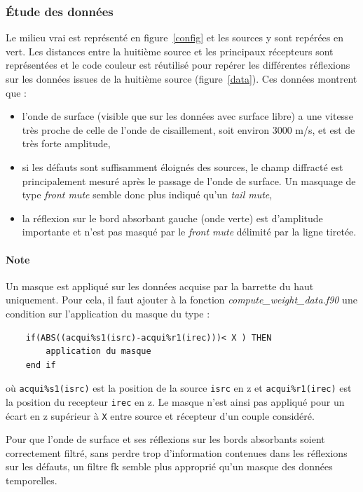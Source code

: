 \documentclass[a4paper,11pt]{report} %
\begin{document}
\subsubsection{Étude des données}
Le milieu vrai est représenté en figure~\ref{config} et les sources y sont repérées en vert. Les distances entre la huitième source et les principaux récepteurs sont représentées et le code couleur est réutilisé pour repérer les différentes réflexions sur les données issues de la huitième source (figure~\ref{data}). Ces données montrent que :
\begin{itemize}
	\item l'onde de surface (visible que sur les données avec surface libre) a une vitesse très proche de celle de l'onde de cisaillement, soit environ 3000 m/s, et est de très forte amplitude,
	\item si les défauts sont suffisamment éloignés des sources, le champ diffracté est principalement mesuré après le passage de l'onde de surface. Un masquage de type \emph{front mute} semble donc plus indiqué qu'un \emph{tail mute},
	\item la réflexion sur le bord absorbant gauche (onde verte) est d'amplitude importante et n'est pas masqué par le \emph{front mute} délimité par la ligne tiretée.
\end{itemize}


\paragraph{Note}  Un masque est appliqué sur les données acquise par la barrette du haut uniquement. Pour cela, il faut ajouter à la fonction \emph{compute\_weight\_data.f90} une condition sur l'application du masque du type : 
\begin{verbatim}
    if(ABS((acqui%s1(isrc)-acqui%r1(irec)))< X ) THEN 
        application du masque
    end if
\end{verbatim}
où \texttt{acqui\%s1(isrc)} est la position de la source \texttt{isrc} en z et \texttt{acqui\%r1(irec)} est la position du recepteur \texttt{irec} en z. Le masque n'est ainsi pas appliqué pour un écart en z supérieur à \texttt{X} entre source et récepteur d'un couple considéré.


Pour que l'onde de surface et ses réflexions sur les bords absorbants soient correctement filtré, sans perdre trop d'information contenues dans les réflexions sur les défauts, un filtre fk semble plus approprié qu'un masque des données temporelles.
\end{document}
